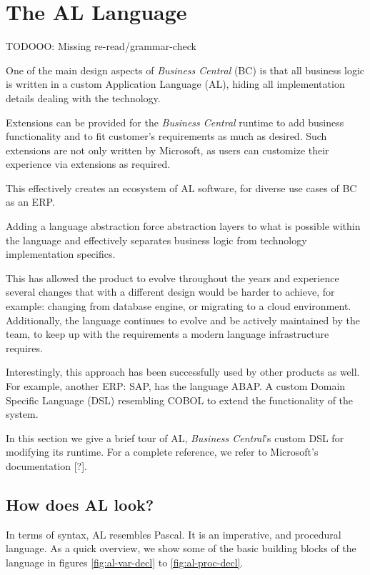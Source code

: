 \chapter{The AL Language}
\label{sec:appendix-allang}
TODOOO: Missing re-read/grammar-check

One of the main design aspects of \emph{Business Central} (BC) is that all business logic is written in 
a custom Application Language (AL), hiding all implementation details dealing with the technology.

Extensions can be provided for the \emph{Business Central} runtime to add business functionality
and to fit customer's requirements as much as desired. Such extensions are not only written by
Microsoft, as users can customize their experience via extensions as required.

This effectively creates an ecosystem of AL software, for diverse use cases of BC as an ERP.

Adding a language abstraction force abstraction layers to what is possible within the language
and effectively separates business logic from technology implementation specifics.

This has allowed the product to evolve throughout the years and experience several changes 
that with a different design would be harder to achieve, for example: changing from 
database engine, or migrating to a cloud environment. Additionally, the language continues
to evolve and be actively maintained by the team, to keep up with the requirements
a modern language infrastructure requires.

Interestingly, this approach has been successfully used by other products as well. For example,
another ERP: SAP, has the language ABAP. A custom Domain Specific Language (DSL) resembling COBOL
to extend the functionality of the system.

In this section we give a brief tour of AL, \emph{Business Central}'s custom DSL for modifying
its runtime. For a complete reference, we refer to Microsoft's documentation [?].

\section{How does AL look?}

In terms of syntax, AL resembles Pascal. It is an imperative, and procedural language. 
As a quick overview, we show some of the basic building blocks of the language
in figures \ref{fig:al-var-decl} to \ref{fig:al-proc-decl}.


